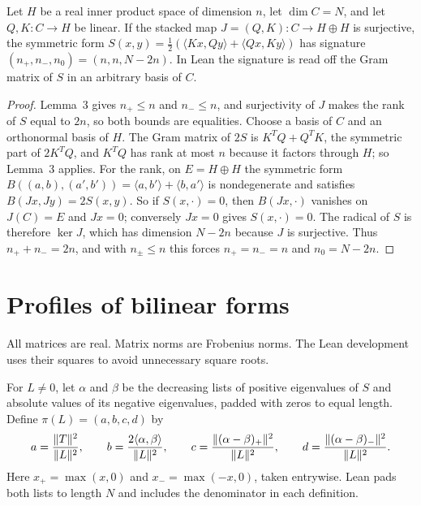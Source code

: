 \setcounter{theorem}{2}
\begin{theorem}
\label{thm:balanced}
\leanok
{}
Let $H$ be a real inner product space of dimension $n$, let $\dim C=N$, and
let $Q,K\colon C\to H$ be linear. If the stacked map
$J=(Q,K)\colon C\to H\oplus H$ is surjective, the symmetric form
$S(x,y)=\tfrac12(\langle Kx,Qy\rangle+\langle Qx,Ky\rangle)$ has signature
$(n_+,n_-,n_0)=(n,n,N-2n)$. In Lean the signature is read off the Gram
matrix of $S$ in an arbitrary basis of $C$.
\end{theorem}
\begin{proof}
\leanok
{}
Lemma~3 gives $n_+\le n$ and $n_-\le n$, and surjectivity of $J$ makes
the rank of $S$ equal to $2n$, so both bounds are equalities. Choose a
basis of $C$ and an orthonormal basis of $H$. The Gram matrix of $2S$ is
$K^TQ+Q^TK$, the symmetric part of $2K^TQ$, and $K^TQ$ has rank at most
$n$ because it factors through $H$; so Lemma~3 applies. For the rank, on
$E=H\oplus H$ the symmetric form
$B((a,b),(a',b'))=\langle a,b'\rangle+\langle b,a'\rangle$ is
nondegenerate and satisfies $B(Jx,Jy)=2S(x,y)$. So if $S(x,\cdot)=0$, then
$B(Jx,\cdot)$ vanishes on $J(C)=E$ and $Jx=0$; conversely $Jx=0$ gives
$S(x,\cdot)=0$. The radical of $S$ is therefore $\ker J$, which has
dimension $N-2n$ because $J$ is surjective. Thus $n_++n_-=2n$, and with
$n_\pm\le n$ this forces $n_+=n_-=n$ and $n_0=N-2n$.
\end{proof}

\chapter{Profiles of bilinear forms}

All matrices are real. Matrix norms are Frobenius norms. The Lean
development uses their squares to avoid unnecessary square roots.

\setcounter{definition}{5}
\begin{definition}
\label{def:profile}
\leanok
{}
For $L\ne0$, let $\alpha$ and $\beta$ be the decreasing lists of positive
eigenvalues of $S$ and absolute values of its negative eigenvalues,
padded with zeros to equal length. Define $\pi(L)=(a,b,c,d)$ by
\[
 a=\frac{\lVert T\rVert^2}{\lVert L\rVert^2},\qquad
 b=\frac{2\langle\alpha,\beta\rangle}{\lVert L\rVert^2},\qquad
 c=\frac{\lVert (\alpha-\beta)_+\rVert^2}{\lVert L\rVert^2},\qquad
 d=\frac{\lVert (\alpha-\beta)_-\rVert^2}{\lVert L\rVert^2}.
\]
Here $x_+=\max(x,0)$ and $x_-=\max(-x,0)$, taken entrywise. Lean pads both lists
to length $N$ and includes the denominator in each definition.
\end{definition}


